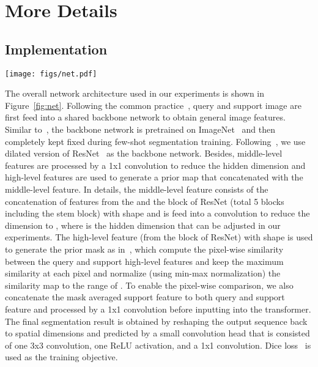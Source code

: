 \documentclass{article}
\begin{document}






\appendix

\section{More Details}
\subsection{Implementation}

\begin{figure*}[ht]
    \centering
    \texttt{[image: figs/net.pdf]}
    \caption{The network structure used in our experiments. The backbone network first extracts features for query and support images. To enable the pixel-wise comparison in transformer, the averaged foreground support feature is expanded and concatenated with both query and support features. Our Cycle-Consistent TRansformer (CyCTR) takes the flattened query and support features as well as the flattened support mask as input and produces the encoded query feature for prediction.}
    \label{fig:net}
\end{figure*}

The overall network architecture used in our experiments is shown in Figure~\ref{fig:net}. Following the common practice~\cite{tian2020pfenet,wang2019panet,zhang2019canet}, query and support image are first feed into a shared backbone network to obtain general image features. Similar to~\cite{tian2020pfenet}, the backbone network is pretrained on ImageNet~\cite{russakovsky2015imagenet} and then completely kept fixed during few-shot segmentation training. Following~\cite{liu2020ppnet,tian2020pfenet,yang2020PMM}, we use dilated version of ResNet~\cite{he2015resnet} as the backbone network. Besides, middle-level features are processed by a 1x1 convolution to reduce the hidden dimension and high-level features are used to generate a prior map that concatenated with the middle-level feature. In details, the middle-level feature consists of the concatenation of features from the  and the  block of ResNet (total 5 blocks including the stem block) with shape  and is feed into a  convolution to reduce the dimension to , where  is the hidden dimension that can be adjusted in our experiments. The high-level feature (from the  block of ResNet) with shape  is used to generate the prior mask as in~\cite{tian2020pfenet}, which compute the pixel-wise similarity between the query and support high-level features and keep the maximum similarity at each pixel and normalize (using min-max normalization) the similarity map to the range of . To enable the pixel-wise comparison, we also concatenate the mask averaged support feature to both query and support feature and processed by a 1x1 convolution before inputting into the transformer. The final segmentation result is obtained by reshaping the output sequence back to spatial dimensions and predicted by a small convolution head that is consisted of one 3x3 convolution, one ReLU activation, and a 1x1 convolution. Dice loss~\cite{milletari2016diceloss} is used as the training objective. 
\end{document}
